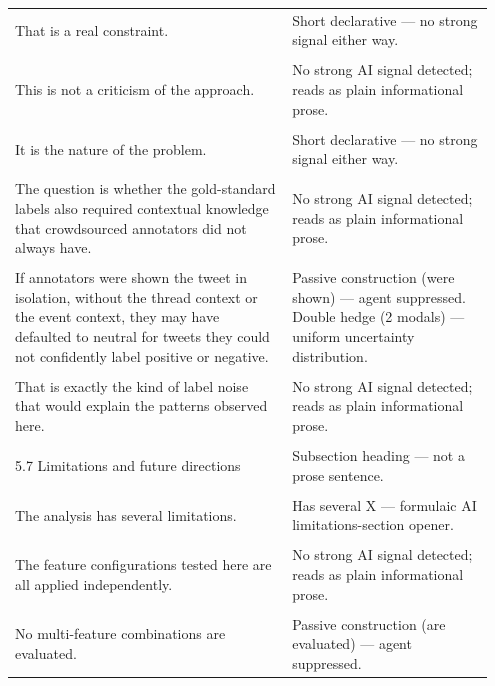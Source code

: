 \documentclass[11pt]{article}
\begin{document}
\begin{longtable}{|p{0.55\linewidth}|p{0.40\linewidth}|}
\hline
\rule{0pt}{3.5cm} & \\
\hline
That is a real constraint. & Short declarative --- no strong signal either way. \\[2pt]
\hline
\rule{0pt}{3.5cm} & \\
\hline
This is not a criticism of the approach. & No strong AI signal detected; reads as plain informational prose. \\[2pt]
\hline
\rule{0pt}{3.5cm} & \\
\hline
It is the nature of the problem. & Short declarative --- no strong signal either way. \\[2pt]
\hline
\rule{0pt}{3.5cm} & \\
\hline
The question is whether the gold-standard labels also required contextual knowledge that crowdsourced annotators did not always have. & No strong AI signal detected; reads as plain informational prose. \\[2pt]
\hline
\rule{0pt}{3.5cm} & \\
\hline
If annotators were shown the tweet in isolation, without the thread context or the event context, they may have defaulted to neutral for tweets they could not confidently label positive or negative. & Passive construction (were shown) --- agent suppressed. Double hedge (2 modals) --- uniform uncertainty distribution. \\[2pt]
\hline
\rule{0pt}{3.5cm} & \\
\hline
That is exactly the kind of label noise that would explain the patterns observed here. & No strong AI signal detected; reads as plain informational prose. \\[2pt]
\hline
\rule{0pt}{3.5cm} & \\
\hline
5.7 Limitations and future directions & Subsection heading --- not a prose sentence. \\[2pt]
\hline
\rule{0pt}{3.5cm} & \\
\hline
The analysis has several limitations. & Has several X --- formulaic AI limitations-section opener. \\[2pt]
\hline
\rule{0pt}{3.5cm} & \\
\hline
The feature configurations tested here are all applied independently. & No strong AI signal detected; reads as plain informational prose. \\[2pt]
\hline
\rule{0pt}{3.5cm} & \\
\hline
No multi-feature combinations are evaluated. & Passive construction (are evaluated) --- agent suppressed. \\[2pt]

\end{longtable}
\end{document}

